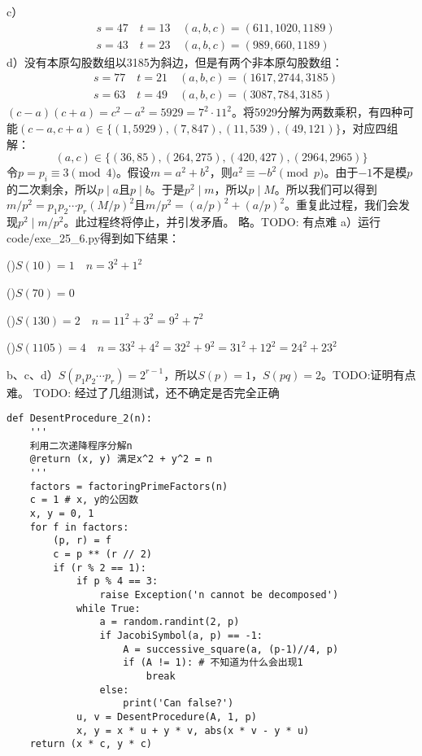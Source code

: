 c）
\begin{align*}
&s=47\quad t=13\quad (a,b,c)=(611, 1020, 1189)\\
&s=43\quad t=23\quad (a,b,c)=(989, 660, 1189)
\end{align*}
d）没有本原勾股数组以3185为斜边，但是有两个非本原勾股数组：
\begin{align*}
&s=77\quad t=21\quad (a,b,c)=(1617, 2744, 3185)\\
&s=63\quad t=49\quad (a,b,c)=(3087, 784, 3185)
\end{align*}
%
\exercise $(c-a)(c+a)=c^2-a^2=5929=7^2\cdot11^2$。将5929分解为两数乘积，有四种可能$(c-a, c+a)\in\{(1,5929),(7,847),(11,539),(49,121)\}$，对应四组解：
\[(a,c)\in\{(36,85),(264,275),(420,427),(2964,2965)\}\]
%
\exercise 令$p=p_i\equiv3\pmod4$。假设$m=a^2+b^2$，则$a^2\equiv-b^2\pmod p$。由于$-1$不是模$p$的二次剩余，所以$p\mid a$且$p\mid b$。于是$p^2\mid m$，所以$p\mid M$。所以我们可以得到$m/p^2=p_1p_2\cdots p_r(M/p)^2$且$m/p^2=(a/p)^2+(a/p)^2$。重复此过程，我们会发现$p^2\mid m/p^2$。此过程终将停止，并引发矛盾。
%
\exercise 略。TODO: 有点难
%
\exercise a）运行code/exe\_25\_6.py得到如下结果：\par
()$S(10)=1\quad n=3^2+1^2$\par
()$S(70)=0$\par
()$S(130)=2\quad n=11^2+3^2=9^2+7^2$\par
()$S(1105)=4\quad n=33^2+4^2=32^2+9^2=31^2+12^2=24^2+23^2$\par
b、c、d）$S(p_1p_2\cdots p_r)=2^{r-1}$，所以$S(p)=1$，$S(pq)=2$。TODO:证明有点难。
%
\exercise TODO: 经过了几组测试，还不确定是否完全正确
\begin{lstlisting}
def DesentProcedure_2(n):
    '''
    利用二次递降程序分解n
    @return (x, y) 满足x^2 + y^2 = n
    '''
    factors = factoringPrimeFactors(n)
    c = 1 # x, y的公因数
    x, y = 0, 1
    for f in factors:
        (p, r) = f
        c = p ** (r // 2)
        if (r % 2 == 1):
            if p % 4 == 3:
                raise Exception('n cannot be decomposed')
            while True:
                a = random.randint(2, p)
                if JacobiSymbol(a, p) == -1:
                    A = successive_square(a, (p-1)//4, p)
                    if (A != 1): # 不知道为什么会出现1
                        break
                else:
                    print('Can false?')
            u, v = DesentProcedure(A, 1, p)
            x, y = x * u + y * v, abs(x * v - y * u)
    return (x * c, y * c)
\end{lstlisting}